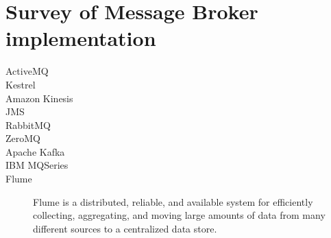 \chapter{Survey of Message Broker implementation} 
\label{survey-broker}
\begin{description}
    \item [ActiveMQ]
    \item [Kestrel]
    \item [Amazon Kinesis]
    \item [JMS]
    \item [RabbitMQ]
    \item [ZeroMQ]
    \item [Apache Kafka]
    \item [IBM MQSeries]
    \item [Flume] Flume is a distributed, reliable, and available system for efficiently collecting, aggregating, and moving large amounts of data from many different sources to a centralized data store.
\end{description}


